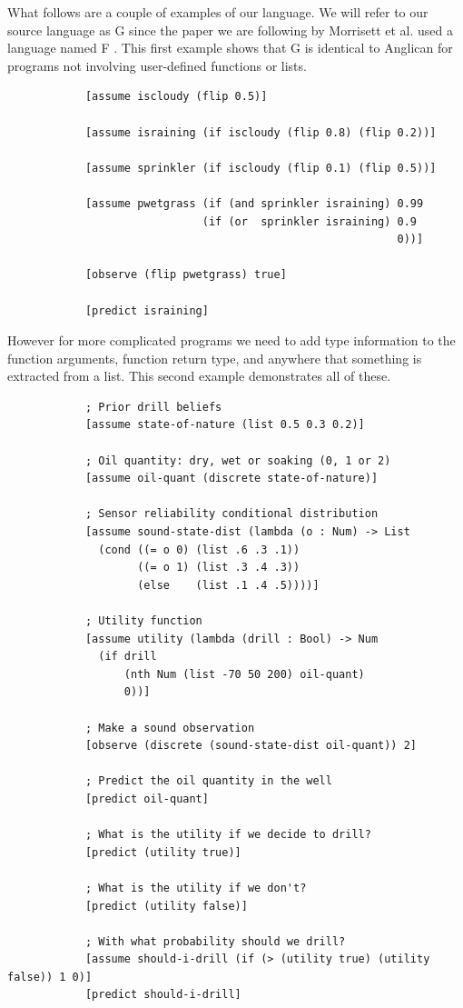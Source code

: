 \documentclass[a4paper]{article}
\begin{document}
What follows are a couple of examples of our language. We will refer to our source language as G since the paper we are following by Morrisett et al. used a language named F \cite{SystemF}. This first example shows that G is identical to Anglican for programs not involving user-defined functions or lists.
\begin{center}
	\begin{varwidth}{\linewidth}
		\small
		\begin{verbatim}
			[assume iscloudy (flip 0.5)]
			
			[assume israining (if iscloudy (flip 0.8) (flip 0.2))]
			
			[assume sprinkler (if iscloudy (flip 0.1) (flip 0.5))]
			
			[assume pwetgrass (if (and sprinkler israining) 0.99
			                  (if (or  sprinkler israining) 0.9
			                                                0))]
			
			[observe (flip pwetgrass) true]
			
			[predict israining]
		\end{verbatim}
	\end{varwidth}
\end{center}
However for more complicated programs we need to add type information to the function arguments, function return type, and anywhere that something is extracted from a list. This second example demonstrates all of these.
\begin{center}
	\begin{varwidth}{\linewidth}
		\small
		\begin{verbatim}
			; Prior drill beliefs
			[assume state-of-nature (list 0.5 0.3 0.2)] 

			; Oil quantity: dry, wet or soaking (0, 1 or 2)
			[assume oil-quant (discrete state-of-nature)]

			; Sensor reliability conditional distribution
			[assume sound-state-dist (lambda (o : Num) -> List
			  (cond ((= o 0) (list .6 .3 .1))
			        ((= o 1) (list .3 .4 .3))
			        (else    (list .1 .4 .5))))]

			; Utility function 
			[assume utility (lambda (drill : Bool) -> Num 
			  (if drill
			      (nth Num (list -70 50 200) oil-quant)
			      0))]

			; Make a sound observation
			[observe (discrete (sound-state-dist oil-quant)) 2]

			; Predict the oil quantity in the well
			[predict oil-quant]

			; What is the utility if we decide to drill?
			[predict (utility true)]

			; What is the utility if we don't?
			[predict (utility false)]

			; With what probability should we drill?
			[assume should-i-drill (if (> (utility true) (utility false)) 1 0)]
			[predict should-i-drill]
		\end{verbatim}
	\end{varwidth}
\end{center}
\end{document}
